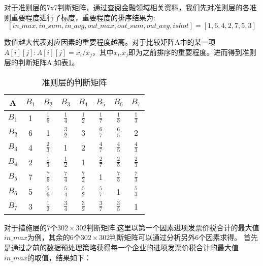 \documentclass{cumcmthesis}
\begin{document}
对于准则层的7x7判断矩阵，通过查阅金融领域相关资料，我们先对准则层的各准则重要程度进行了标度，重要程度的排序结果为:$$\left[ in\_max,in\_sum,in\_avg,out\_max,out\_sum,out\_avg,ishot\right]=[1,6,4,2,7,5,3]$$

数值越大代表对应因素的重要程度越高。对于比较矩阵A中的某一项$A\left[i\right]\left[j\right]:A\left[i\right]\left[j\right]=x_i/x_j$，其中$x_i$,$x_j$即为之前排序的重要程度。进而得到准则层的判断矩阵A,如表\ref{tablejudge}。

\begin{table}[H]
    \centering
    \begin{tabular}{|c|ccccccc|}%
    \hline
        A & $B_1$ & $B_2$ & $B_3$ & $B_4$ & $B_5$ & $B_6$ & $B_7$   \\
    \hline 
    $B_1$  &  1   &$\frac{1}{6}$  &$\frac{1}{4}$  &$\frac{1}{2}$  &$\frac{1}{7}$  &$\frac{1}{5}$  &$\frac{1}{3}$\\
    $B_2$  &  6   &1              &$\frac{3}{2}$  &3              &$\frac{6}{7}$  &$\frac{6}{5}$  &2\\
    $B_3$  &  4   &$\frac{2}{3}$  &1              &2              &$\frac{4}{7}$  &$\frac{4}{5}$  &$\frac{4}{3}$\\
    $B_4$  &  2   &$\frac{1}{3}$  &$\frac{1}{2}$  &1              &$\frac{2}{7}$  &$\frac{2}{5}$  &$\frac{2}{3}$\\
    $B_5$  &  7   &$\frac{7}{6}$  &$\frac{7}{4}$  &$\frac{7}{2}$  &1              &$\frac{7}{5}$  &$\frac{7}{3}$\\
    $B_6$  &  5   &$\frac{5}{6}$  &$\frac{5}{4}$  &$\frac{5}{2}$  &$\frac{5}{7}$  &1              &$\frac{5}{3}$\\
    $B_7$  &  3   &$\frac{1}{2}$  &$\frac{3}{4}$  &$\frac{3}{2}$  &$\frac{3}{7}$  &$\frac{3}{5}$  &1\\
    \hline
\end{tabular}
    \caption{准则层的判断矩阵}
    \label{tablejudge}
\end{table}
对于措施层的7个$302 \times 302$判断矩阵,这里以第一个因素进项发票价税合计的最大值$in\_max$为例，其余的6个$302\times 302$判断矩阵可以通过分析另外6个因素求得。
首先是通过之前的数据预处理策略获得每一个企业的进项发票价税合计的最大值$in\_max$的取值，结果如下：
\end{document}
